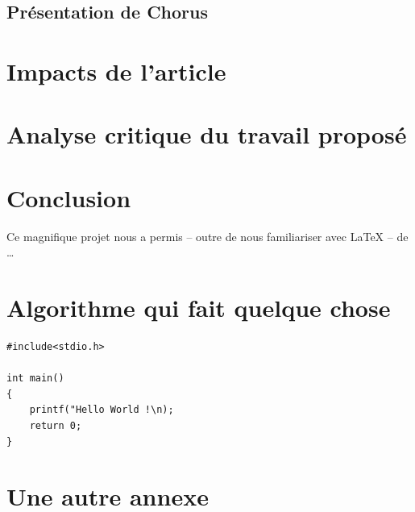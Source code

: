 \documentclass[a4paper, 12pt]{article}
\begin{document}
\subsection{Présentation de Chorus}


\clearpage 
\section{Impacts de l'article}

\clearpage 
\section{Analyse critique du travail proposé}

\clearpage 
\section*{Conclusion}

Ce magnifique projet nous a permis -- outre de nous familiariser avec \LaTeX{} -- de \ldots

\clearpage 




\clearpage 
\appendix
\bigskip{}
\section{Algorithme qui fait quelque chose}
\begin{verbatim}
#include<stdio.h>

int main()
{
	printf("Hello World !\n);
	return 0;
}
\end{verbatim}

\clearpage 
\section{Une autre annexe}
\end{document}
